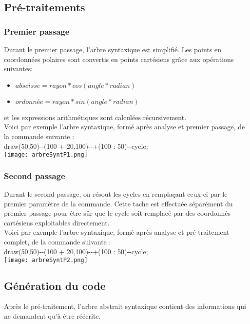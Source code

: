 \documentclass[a4paper,titlepage]{article}
\begin{document}
\subsection{Pré-traitements}

\subsubsection{Premier passage}
Durant le premier passage, l'arbre syntaxique est simplifié. Les points en coordonnées polaires sont convertis en points cartésiens grâce aux opérations suivantes:
\begin{itemize}
\item $abscisse = rayon * cos(angle * radian)$
\item $ordonnée = rayon * sin(angle * radian)$
\end{itemize}
et les expressions arithmétiques sont calculées récursivement.\\

Voici par exemple l'arbre syntaxique, formé après analyse et premier passage, de la commande suivante :\\
draw(50,50)\--\--(100 + 20,100)\--\--+(100 : 50)\--\--cycle;\\

\texttt{[image: arbreSyntP1.png]}


\subsubsection{Second passage}
Durant le second passage, on résout les cycles en remplaçant ceux-ci par le premier paramètre de la commande. Cette tache est effectuée séparément du premier passage pour être sûr que le cycle soit remplacé par des coordonnés cartésiens exploitables directement.\\

Voici par exemple l'arbre syntaxique, formé après analyse et pré-traitement complet, de la commande suivante :\\
draw(50,50)\--\--(100 + 20,100)\--\--+(100 : 50)\--\--cycle;\\

\texttt{[image: arbreSyntP2.png]}

\subsection{Génération du code}

Après le pré-traitement, l'arbre abstrait syntaxique contient des informations qui ne demandent qu'à être réécrite.\\
\end{document}
